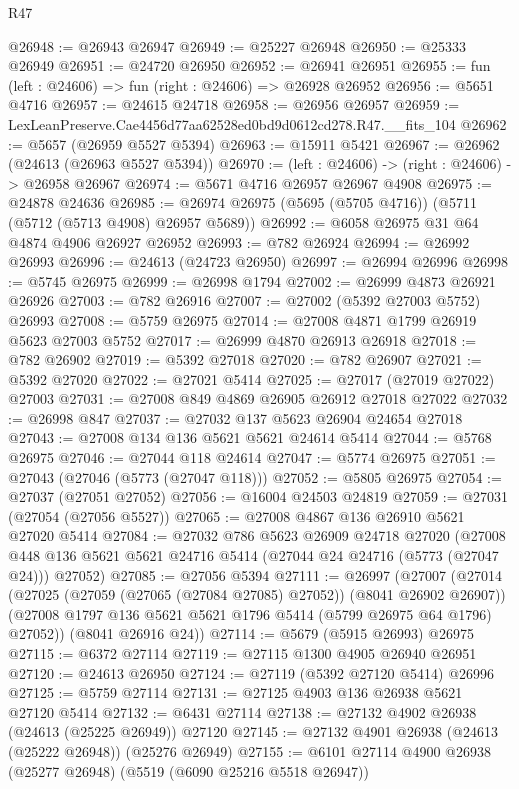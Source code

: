 \begin{lexlean}{R47}
\begin{coremodule}
@26948 := @26943 @26947
@26949 := @25227 @26948
@26950 := @25333 @26949
@26951 := @24720 @26950
@26952 := @26941 @26951
@26955 := fun (left : @24606) => fun (right : @24606) => @26928 @26952
@26956 := @5651 @4716
@26957 := @24615 @24718
@26958 := @26956 @26957
@26959 := LexLeanPreserve.Cae4456d77aa62528ed0bd9d0612cd278.R47.__fits_104
@26962 := @5657 (@26959 @5527 @5394)
@26963 := @15911 @5421
@26967 := @26962 (@24613 (@26963 @5527 @5394))
@26970 := (left : @24606) -> (right : @24606) -> @26958 @26967
@26974 := @5671 @4716 @26957 @26967 @4908
@26975 := @24878 @24636
@26985 := @26974 @26975 (@5695 (@5705 @4716)) (@5711 (@5712 (@5713 @4908) @26957 @5689))
@26992 := @6058 @26975 @31 @64 @4874 @4906 @26927 @26952
@26993 := @782 @26924
@26994 := @26992 @26993
@26996 := @24613 (@24723 @26950)
@26997 := @26994 @26996
@26998 := @5745 @26975
@26999 := @26998 @1794
@27002 := @26999 @4873 @26921 @26926
@27003 := @782 @26916
@27007 := @27002 (@5392 @27003 @5752) @26993
@27008 := @5759 @26975
@27014 := @27008 @4871 @1799 @26919 @5623 @27003 @5752
@27017 := @26999 @4870 @26913 @26918
@27018 := @782 @26902
@27019 := @5392 @27018
@27020 := @782 @26907
@27021 := @5392 @27020
@27022 := @27021 @5414
@27025 := @27017 (@27019 @27022) @27003
@27031 := @27008 @849 @4869 @26905 @26912 @27018 @27022
@27032 := @26998 @847
@27037 := @27032 @137 @5623 @26904 @24654 @27018
@27043 := @27008 @134 @136 @5621 @5621 @24614 @5414
@27044 := @5768 @26975
@27046 := @27044 @118 @24614
@27047 := @5774 @26975
@27051 := @27043 (@27046 (@5773 (@27047 @118)))
@27052 := @5805 @26975
@27054 := @27037 (@27051 @27052)
@27056 := @16004 @24503 @24819
@27059 := @27031 (@27054 (@27056 @5527))
@27065 := @27008 @4867 @136 @26910 @5621 @27020 @5414
@27084 := @27032
    @786
    @5623
    @26909
    @24718
    @27020
    (@27008 @448 @136 @5621 @5621 @24716 @5414 (@27044 @24 @24716 (@5773 (@27047 @24))) @27052)
@27085 := @27056 @5394
@27111 := @26997
    (@27007
      (@27014
        (@27025 (@27059 (@27065 (@27084 @27085) @27052)) (@8041 @26902 @26907))
        (@27008 @1797 @136 @5621 @5621 @1796 @5414 (@5799 @26975 @64 @1796) @27052))
      (@8041 @26916 @24))
@27114 := @5679 (@5915 @26993) @26975
@27115 := @6372 @27114
@27119 := @27115 @1300 @4905 @26940 @26951
@27120 := @24613 @26950
@27124 := @27119 (@5392 @27120 @5414) @26996
@27125 := @5759 @27114
@27131 := @27125 @4903 @136 @26938 @5621 @27120 @5414
@27132 := @6431 @27114
@27138 := @27132 @4902 @26938 (@24613 (@25225 @26949)) @27120
@27145 := @27132 @4901 @26938 (@24613 (@25222 @26948)) (@25276 @26949)
@27155 := @6101 @27114 @4900 @26938 (@25277 @26948) (@5519 (@6090 @25216 @5518 @26947))

\end{coremodule}
\end{lexlean}
